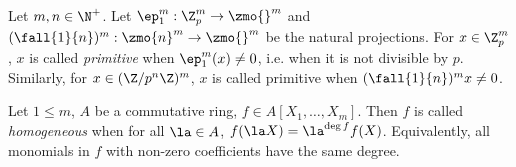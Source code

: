 \begin{dfn}
  
  Let $m, n \in \N^+$. 
  Let $\ep_1^m : \Z_p^m \to \zmo{}^m$ and 
  $(\fall{1}{n})^m : \zmo{n}^m \to \zmo{}^m$ be the natural projections. 
  For $x \in \Z_p^m$, $x$ is called \emph{primitive} when $\ep_1^m(x) \neq 0$,
  i.e. when it is not divisible by $p$. 
  Similarly, for $x \in (\Z/p^n\Z)^m$, 
  $x$ is called primitive when $(\fall{1}{n})^m x \neq 0$. 
\end{dfn}

\begin{dfn}
  
  Let $1 \leq m$, $A$ be a commutative ring,
  $f \in A[X_1,\dots,X_m]$. 
  Then $f$ is called \emph{homogeneous} when 
  for all $\la \in A$, $f(\la X) = \la^{\deg f} f(X)$.
  Equivalently, all monomials in $f$ with non-zero coefficients 
  have the same degree. 
\end{dfn}


